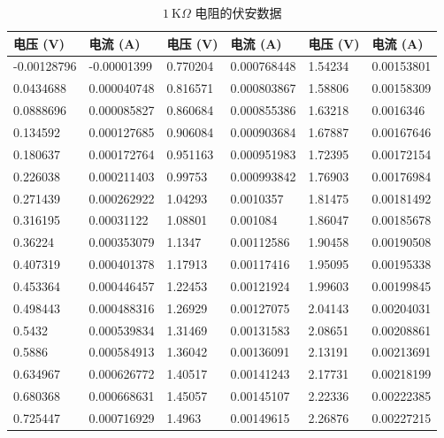 \documentclass[UTF8]{article}
\def\KO{\ \mathrm{K}\Omega}
\theoremstyle{MyLineTheoremStyle} %
\theoremstyle{MyBlockTheoremStyle} %
\theoremstyle{MySubsubsectionStyle} %
\begin{document}
\begin{table}[H]\centering
\caption{$1 \KO$ 电阻的伏安数据}
\label{1K欧电阻伏安数据}
\begin{tabular}{|ll|ll|ll|}
    \hline
    电压 (V)  & 电流 (A)   & 电压 (V)  & 电流 (A)   &电压 (V)  & 电流 (A) \\ \hline
    -0.00128796 & -0.00001399   & 0.770204 & 0.000768448 & 1.54234 & 0.00153801  \\
    0.0434688   & 0.000040748    & 0.816571 & 0.000803867 & 1.58806 & 0.00158309  \\
    0.0888696   & 0.000085827    & 0.860684 & 0.000855386 & 1.63218 & 0.0016346   \\
    0.134592    & 0.000127685 & 0.906084 & 0.000903684 & 1.67887 & 0.00167646  \\
    0.180637    & 0.000172764 & 0.951163 & 0.000951983 & 1.72395 & 0.00172154  \\
    0.226038    & 0.000211403 & 0.99753  & 0.000993842 & 1.76903 & 0.00176984  \\
    0.271439    & 0.000262922 & 1.04293  & 0.0010357   & 1.81475 & 0.00181492  \\
    0.316195    & 0.00031122  & 1.08801  & 0.001084    & 1.86047 & 0.00185678  \\
    0.36224     & 0.000353079 & 1.1347   & 0.00112586  & 1.90458 & 0.00190508  \\
    0.407319    & 0.000401378 & 1.17913  & 0.00117416  & 1.95095 & 0.00195338  \\
    0.453364    & 0.000446457 & 1.22453  & 0.00121924  & 1.99603 & 0.00199845  \\
    0.498443    & 0.000488316 & 1.26929  & 0.00127075  & 2.04143 & 0.00204031  \\
    0.5432      & 0.000539834 & 1.31469  & 0.00131583  & 2.08651 & 0.00208861  \\
    0.5886      & 0.000584913 & 1.36042  & 0.00136091  & 2.13191 & 0.00213691  \\
    0.634967    & 0.000626772 & 1.40517  & 0.00141243  & 2.17731 & 0.00218199  \\
    0.680368    & 0.000668631 & 1.45057  & 0.00145107  & 2.22336 & 0.00222385  \\
    0.725447    & 0.000716929 & 1.4963   & 0.00149615  & 2.26876 & 0.00227215 \\
    \hline
\end{tabular}
\end{table}
\end{document}
